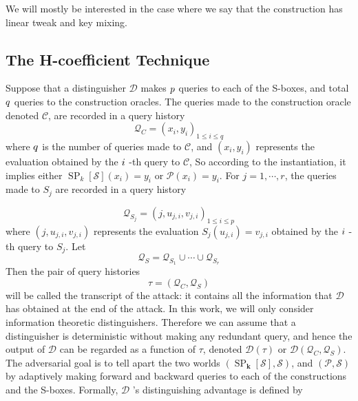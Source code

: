 We will mostly be interested in the case where
we say that the construction has linear tweak and key mixing.




\subsection{The H-coefficient Technique}
Suppose that a distinguisher $\mathcal{D}$ makes $\mathnormal{p}$ queries to each of the S-boxes, and total $\mathnormal{q}$ queries to the construction oracles. The queries made to the construction oracle denoted $\mathcal{C}$, are recorded in a query history $$
\mathcal{Q}_{C} = (x_i,y_i)_{1 \leq i \leq q}
$$
where $\mathnormal{q}$ is the number of queries made to $\mathcal{C}$, and $(x_i,y_i)$ represents the evaluation obtained by the $\mathnormal{i}$ -th query to $\mathcal{C}$, So according to the instantiation, it implies either $\operatorname{SP}_k[\mathcal{S}](x_i) = y_i$  or $\mathcal{P}(x_i) = y_i$. For $j = 1,\cdots,r$, the queries made to $S_j$ are recorded in a query history

$$
\mathcal{Q}_{S_j} = (j, u_{j,i}, v_{j,i})_{1 \leq i \leq p}
$$
where $(j, u_{j,i}, v_{j,i})$  represents the evaluation $S_j(u_{j,i}) = v_{j,i}$ obtained by the $\mathnormal{i}$ -th query to $S_j$. Let
$$
\mathcal{Q}_{S}=\mathcal{Q}_{S_1} \cup \cdots \cup \mathcal{Q}_{S_r}
$$
Then the pair of query histories
$$
\tau = (\mathcal{Q}_{C}, \mathcal{Q}_{S})
$$
will be called the transcript of the attack: it contains all the information that  $\mathcal{D}$ has obtained at the end of the attack. In this work, we will only consider
information theoretic distinguishers. Therefore we can assume that a distinguisher is deterministic without making any redundant query, and hence the output of  $\mathcal{D}$  can be regarded as a function of $\tau$, denoted $\mathcal{D}(\tau)$ or $\mathcal{D}(\mathcal{Q}_C, \mathcal{Q}_S)$.\\

The adversarial goal is to tell apart the two worlds $\left(\operatorname{SP}_{\mathbf{k}}[\mathcal{S}],\mathcal{S}\right)$, and $\left(\mathcal{P},\mathcal{S}\right)$ by adaptively making forward and backward queries to each of the constructions and the S-boxes. Formally, $\mathcal{D}$ 's distinguishing advantage is defined by

